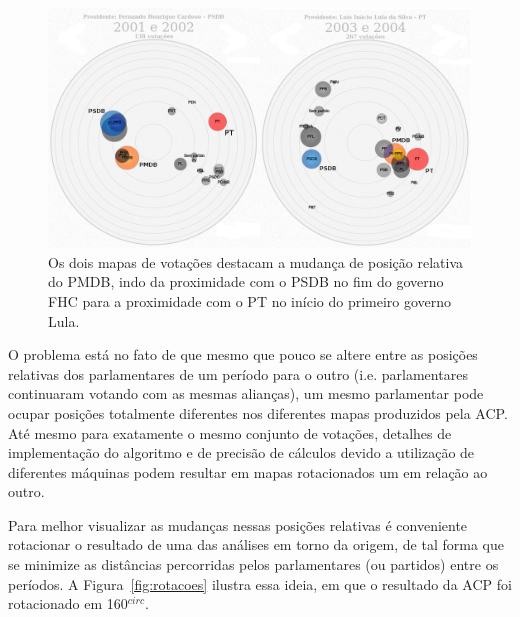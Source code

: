 \documentclass[
	article,			%
	12pt,				%
	oneside,			%
	a4paper,			%
	english,			%
	brazil,				%
	sumario=tradicional,
	oldfontcommands %
	]{abntex2}
\begin{document}
\begin{figure}[h]
  \centering
  \includegraphics[scale=0.37]{figs/fhc2-lula1.png}
  \caption{Os dois mapas de votações destacam a mudança de posição relativa do PMDB, indo da proximidade com o PSDB no fim do governo FHC para a proximidade com o PT no início do primeiro governo Lula.}
  \label{fig:fhc2-lula1}
\end{figure}

O problema está no fato de que mesmo que pouco se altere entre as posições relativas dos parlamentares de um período para o outro (i.e. parlamentares continuaram votando com as mesmas alianças), um mesmo parlamentar pode ocupar posições totalmente diferentes nos diferentes mapas produzidos pela ACP. Até mesmo para exatamente o mesmo conjunto de votações, detalhes de implementação do algoritmo e de precisão de cálculos devido a utilização de diferentes máquinas podem resultar em mapas rotacionados um em relação ao outro.

Para melhor visualizar as mudanças nessas posições relativas é conveniente rotacionar o resultado de uma das análises em torno da origem, de tal forma que se minimize as distâncias percorridas pelos parlamentares (ou partidos) entre os períodos. A Figura~\ref{fig:rotacoes} ilustra essa ideia, em que o resultado da
ACP foi rotacionado em 160$^{circ}$. \\
\end{document}
